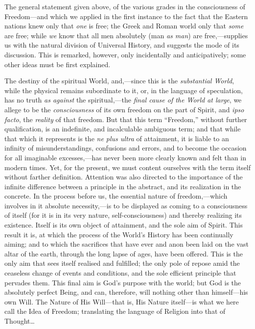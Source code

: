 The general statement given above, of the various grades in the
consciousness of Freedom---and which we applied in the first instance
to the fact that the Eastern nations knew only that \textit{one} is
free; the Greek and Roman world only that \textit{some} are free;
while \textit{we} know that all men absolutely (man \textit{as man})
are free,---supplies us with the natural division of Universal
History, and suggests the mode of its discussion. This is remarked,
however, only incidentally and anticipatively; some other ideas must
be first explained.


The destiny of the spiritual World, and,---since this is the
\textit{substantial World}, while the physical remains subordinate to
it, or, in the language of speculation, has no truth \textit{as
against} the spiritual,---the \textit{final cause of the World at
large}, we allege to be the \textit{consciousness} of its own freedom
on the part of Spirit, and \textit{ipso facto}, the \textit{reality}
of that freedom. But that this term ``Freedom,'' without further
qualification, is an indefinite, and incalculable ambiguous term; and
that while that which it represents is the \textit{ne plus ultra} of
attainment, it is liable to an infinity of misunderstandings,
confusions and errors, and to become the occasion for all imaginable
excesses,---has never been more clearly known and felt than in modern
times. Yet, for the present, we must content ourselves with the term
itself without farther definition. Attention was also directed to the
importance of the infinite difference between a principle in the
abstract, and its realization in the concrete. In the process before
us, the essential nature of freedom,---which involves in it absolute
necessity,---is to be displayed as coming to a consciousness of itself
(for it is in its very nature, self-consciousness) and thereby
realizing its existence. Itself is its own object of attainment, and
the sole aim of Spirit. This result it is, at which the process of the
World's History has been continually aiming; and to which the
sacrifices that have ever and anon been laid on the vast altar of the
earth, through the long lapse of ages, have been offered. This is the
only aim that sees itself realised and fulfilled; the only pole of
repose amid the ceaseless change of events and conditions, and the
sole efficient principle that pervades them. This final aim is God's
purpose with the  world; but God is the absolutely perfect
Being, and can, therefore, will nothing other than himself---his own
Will. The Nature of His Will---that is, His Nature itself---is what we
here call the Idea of Freedom; translating the language of Religion
into that of Thought\ldots

